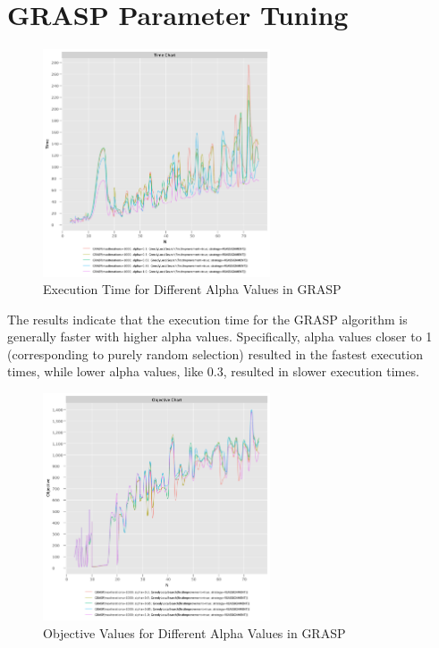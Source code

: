 \documentclass{article}
\begin{document}
\section{GRASP Parameter Tuning}

\begin{figure}[!h]
    \centering
    \includegraphics[width=0.6\textwidth]{./documentation/assets/new.GRASPParams.timeChart.pdf}
    \caption{Execution Time for Different Alpha Values in GRASP}
    \label{fig:grasp_time}
\end{figure}\FloatBarrier

The results indicate that the execution time for the GRASP algorithm is generally faster with higher alpha values. Specifically, alpha values closer to 1 (corresponding to purely random selection) resulted in the fastest execution times, while lower alpha values, like 0.3, resulted in slower execution times.

\begin{figure}[!h]
    \centering
    \includegraphics[width=0.6\textwidth]{./documentation/assets/new.GRASPParams.objectiveChart.pdf}
    \caption{Objective Values for Different Alpha Values in GRASP}
    \label{fig:grasp_objective}
\end{figure}\FloatBarrier
\end{document}
